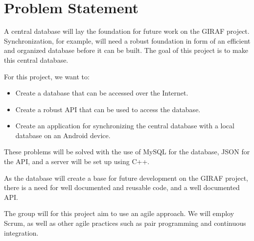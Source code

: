 \section{Problem Statement}
A central database will lay the foundation for future work on the GIRAF project. Synchronization, for example, will need a robust foundation in form of an efficient and organized database before it can be built. The goal of this project is to make this central database.

For this project, we want to:
\begin{itemize}
\item Create a database that can be accessed over the Internet.
\item Create a robust API that can be used to access the database.
\item Create an application for synchronizing the central database with a local database on an Android device.
\end{itemize}

These problems will be solved with the use of MySQL for the database, JSON for the API, and a server will be set up using C++.

As the database will create a base for future development on the GIRAF project, there is a need for well documented and reusable code, and a well documented API.

The group will for this project aim to use an agile approach. We will employ Scrum, as well as other agile practices such as pair programming and continuous integration.